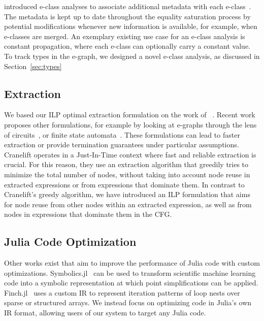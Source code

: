 \citeauthor{willseyEggFastExtensible2021} introduced e-class analyses to associate additional metadata with each e-class~\cite{willseyEggFastExtensible2021}. The metadata is kept up to date throughout the equality saturation process by potential modifications whenever new information is available, for example, when e-classes are merged. An exemplary existing use case for an e-class analysis is constant propagation, where each e-class can optionally carry a constant value. To track types in the e-graph, we designed a novel e-class analysis, as discussed in Section~\ref{sec:types}


\subsection{Extraction}
We based our ILP optimal extraction formulation on the work of \citeauthor{heImprovingTermExtraction2017}~\cite{heImprovingTermExtraction2017}.
Recent work proposes other formulations, for example by looking at e-graphs through the lens of circuits~\cite{sunEgraphsCircuitsOptimal2024}, or finite state automata~\cite{y.wangEGraphsVSAsTree2022}.
These formulations can lead to faster extraction or provide termination guarantees under particular assumptions.
Cranelift operates in a Just-In-Time context where fast and reliable extraction is crucial.
For this reason, they use an extraction algorithm that greedily tries to minimize the total number of nodes, without taking into account node reuse in extracted expressions or from expressions that dominate them.
In contrast to Cranelift's greedy algorithm, we have introduced an ILP formulation that aims for node reuse from other nodes within an extracted expression, as well as from nodes in expressions that dominate them in the CFG. 

\subsection{Julia Code Optimization}
Other works exist that aim to improve the performance of Julia code with custom optimizations.
Symbolics.jl~\cite{gowdaHighperformanceSymbolicnumericsMultiple2022} can be used to transform scientific machine learning code into a symbolic representation at which point simplifications can be applied.
Finch.jl~\cite{ahrensFinchSparseStructured2024,ahrensLoopletsLanguageStructured2023} uses a custom IR to represent iteration patterns of loop nests over sparse or structured arrays.
We instead focus on optimizing code in Julia's own IR format, allowing users of our system to target any Julia code.

